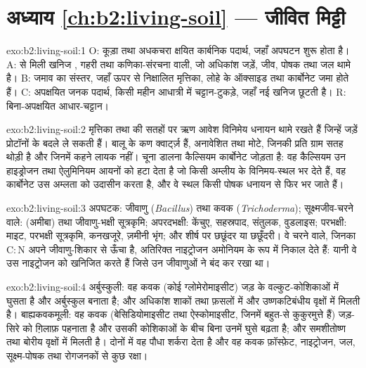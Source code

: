 \section*{अध्याय \ref{ch:b2:living-soil} --- जीवित मिट्टी}

\begin{solution}{exo:b2:living-soil:1}
O: कूड़ा तथा अधकचरा क्षयित कार्बनिक पदार्थ, जहाँ अपघटन
शुरू होता है। A:  से मिली खनिज , गहरी तथा कणिका-संरचना वाली,
जो अधिकांश जड़ें, जीव, पोषक तथा जल थामे है। B: जमाव का संस्तर,
जहाँ ऊपर से निक्षालित मृत्तिका, लोहे के ऑक्साइड तथा कार्बोनेट
जमा होते हैं। C: अपक्षयित जनक पदार्थ, किसी महीन आधात्री में
चट्टान-टुकड़े, जहाँ नई खनिज  छूटती है। R:
बिना-अपक्षयित आधार-चट्टान।
\end{solution}

\begin{solution}{exo:b2:living-soil:2}
मृत्तिका तथा  की सतहों पर ऋण आवेश विनिमेय
धनायन थामे रखते हैं जिन्हें जड़ें प्रोटॉनों के बदले ले सकती हैं। बालू के कण
क्वार्ट्ज़ हैं, अनावेशित तथा मोटे, जिनकी प्रति ग्राम सतह थोड़ी है
और जिनमें कहने लायक  नहीं। चूना डालना कैल्सियम कार्बोनेट जोड़ता है: वह
कैल्सियम उन हाइड्रोजन तथा ऐलुमिनियम आयनों को हटा देता है जो किसी अम्लीय  के
विनिमय-स्थल भर देते हैं, वह कार्बोनेट उस अम्लता को उदासीन करता है,
और वे स्थल किसी पोषक धनायन से फिर भर जाते हैं।
\end{solution}

\begin{solution}{exo:b2:living-soil:3}
अपघटक: जीवाणु (\emph{Bacillus}) तथा कवक
(\emph{Trichoderma}); सूक्ष्मजीव-चरने वाले:  (अमीबा) तथा
जीवाणु-भक्षी सूत्रकृमि; अपरदभक्षी: केंचुए, सहस्रपाद,
संतुलक, वुडलाइस; परभक्षी: माइट, परभक्षी सूत्रकृमि,
कनखजूरे, ज़मीनी भृंग; और शीर्ष पर छछूंदर या छछूँदरी। वे
चरने वाले, जिनका $\mathrm{C:N}$ अपने जीवाणु-शिकार से ऊँचा है,
अतिरिक्त नाइट्रोजन अमोनियम के रूप में निकाल देते हैं: यानी वे
उस नाइट्रोजन को खनिजित करते हैं जिसे उन जीवाणुओं ने बंद कर रखा था।
\end{solution}

\begin{solution}{exo:b2:living-soil:4}
अर्बुस्कुली: वह कवक (कोई ग्लोमेरोमाइसीट) जड़ के
वल्कुट-कोशिकाओं में घुसता है और अर्बुस्कुल बनाता है; और अधिकांश शाकों तथा फ़सलों में और
उष्णकटिबंधीय वृक्षों में मिलती है। बाह्यकवकमूली: वह कवक (बेसिडियोमाइसीट तथा
ऐस्कोमाइसीट, जिनमें बहुत-से कुकुरमुत्ते हैं) जड़-सिरे को ग़िलाफ़ पहनाता है और
उसकी कोशिकाओं के बीच बिना उनमें घुसे बढ़ता है; और समशीतोष्ण
तथा बोरीय वृक्षों में मिलती है। दोनों में वह पौधा शर्करा देता है और वह कवक
फ़ॉस्फ़ेट, नाइट्रोजन, जल, सूक्ष्म-पोषक तथा रोगजनकों से कुछ
रक्षा।
\end{solution}

